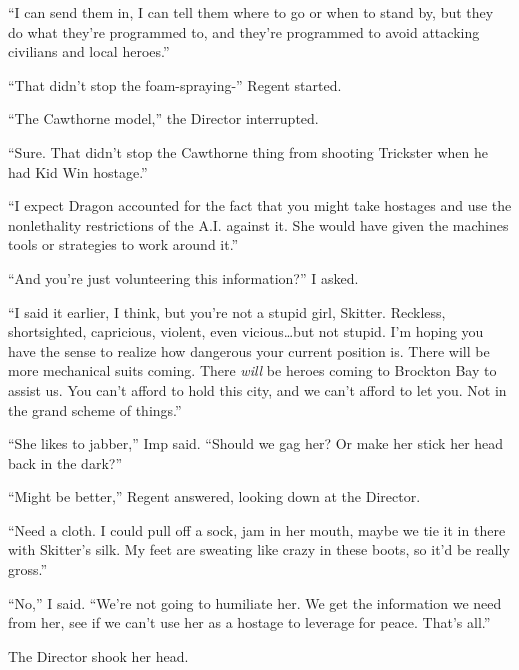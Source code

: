 ``I can send them in, I can tell them where to go or when to stand by, but they do what they're programmed to, and they're programmed to avoid attacking civilians and local heroes.''



``That didn't stop the foam-spraying-''  Regent started.



``The Cawthorne model,'' the Director interrupted.



``Sure.  That didn't stop the Cawthorne thing from shooting Trickster when he had Kid Win hostage.''



``I expect Dragon accounted for the fact that you might take hostages and use the nonlethality restrictions of the A.I. against it.  She would have given the machines tools or strategies to work around it.''



``And you're just volunteering this information?'' I asked.



``I said it earlier, I think, but you're not a stupid girl, Skitter.  Reckless, shortsighted, capricious, violent, even vicious\ldots but not stupid.  I'm hoping you have the sense to realize how dangerous your current position is.  There will be more mechanical suits coming.  There \emph{will} be heroes coming to Brockton Bay to assist us.  You can't afford to hold this city, and we can't afford to let you.  Not in the grand scheme of things.''



``She likes to jabber,'' Imp said.  ``Should we gag her?  Or make her stick her head back in the dark?''



``Might be better,'' Regent answered, looking down at the Director.



``Need a cloth.  I could pull off a sock, jam in her mouth, maybe we tie it in there with Skitter's silk.  My feet are sweating like crazy in these boots, so it'd be really gross.''



``No,'' I said.  ``We're not going to humiliate her.  We get the information we need from her, see if we can't use her as a hostage to leverage for peace.  That's all.''



The Director shook her head.



